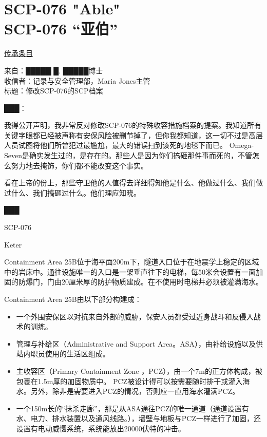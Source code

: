 \chapter[SCP-076 “亚伯”]{
    SCP-076 "Able"\\
    SCP-076 “亚伯”
}

\label{chap:SCP-076}

\hyperref[chap:CENTER-heritage]{ 传承条目}

\begin{scpbox}

来自：█████ █. █████博士\\
收信者：记录与安全管理部，Maria Jones主管\\
标题：修改SCP-076的SCP档案

███：

我得公开声明，我非常反对修改SCP-076的特殊收容措施档案的提案。我知道所有关键字眼都已经被声称有安保风险被删节掉了，但你我都知道，这一切不过是高层人员试图将他们所曾犯过最尴尬，最大的错误扫到该死的地毯下而已。 Omega-Seven是确实发生过的，是存在的。那些人是因为你们搞砸那件事而死的，不管怎么努力地去掩饰，你们都不能改变这个事实。

看在上帝的份上，那些守卫他的人值得去详细得知他是什么、他做过什么、我们做过什么、我们搞砸过什么。他们理应知晓。

███

\end{scpbox}

\hr

SCP-076

Keter

Containment Area 25B位于海平面200m下，隧道入口位于在地震学上稳定的区域中的岩床中。通往设施唯一的入口是一架垂直往下的电梯，每50米会设置有一面加固的防爆门，门由20厘米厚的防护物质建成。在不使用时电梯井必须被灌满海水。

Containment Area 25B由以下部分构建成：

\begin{itemize}
\item 一个外围安保区以对抗来自外部的威胁，保安人员都受过近身战斗和反侵入战术的训练。
\item 管理与补给区（Administrative and Support Area。ASA），由补给设施以及供站内职员使用的生活区组成。
\item 主收容区（Primary Containment Zone ，PCZ），由一个7m的正方体构成，被包裹在1.5m厚的加固物质中。 PCZ被设计得可以按需要随时排干或灌入海水。另外，除非是需要进入PCZ的情况，否则应一直用海水灌满PCZ。
\item 一个150m长的“抹杀走廊”，那是从ASA通往PCZ的唯一通道（通道设置有水、电力、排水装置以及通风线路。），墙壁与地板与PCZ一样进行了加固，还设置有电动威慑系统，系统能放出20000伏特的冲击。
\end{itemize}

